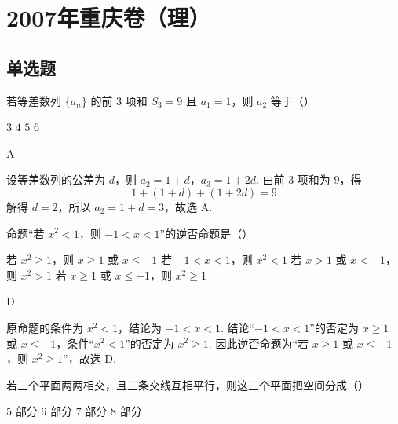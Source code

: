 
\chapter{2007年重庆卷（理）}

\section{单选题}

\begin{problem}
若等差数列 \(\{a_{n}\}\) 的前 \(3\) 项和 \(S_{3} = 9\) 且 \(a_1 = 1\)，则 \(a_2\) 等于（\quad）

\choices
    {\(3\)}
    {\(4\)}
    {\(5\)}
    {\(6\)}
\end{problem}

\begin{answer}
A
\end{answer}

\begin{solution}
设等差数列的公差为 \(d\)，则 \(a_2=1+d\)，\(a_3=1+2d\). 由前 \(3\) 项和为 \(9\)，得
\[
1+(1+d)+(1+2d)=9
\]
解得 \(d=2\)，所以 \(a_2=1+d=3\)，故选 A.
\end{solution}

\begin{problem}
命题“若 \(x^{2} < 1\)，则 \(-1 < x < 1\)”的逆否命题是（\quad）

\choices
    {若 \(x^{2} \geqslant 1\)，则 \(x \geqslant 1\) 或 \(x \leqslant -1\)}
    {若 \(-1 < x < 1\)，则 \(x^{2} < 1\)}
    {若 \(x > 1\) 或 \(x < -1\)，则 \(x^{2} > 1\)}
    {若 \(x \geqslant 1\) 或 \(x \leqslant -1\)，则 \(x^{2} \geqslant 1\)}
\end{problem}

\begin{answer}
D
\end{answer}

\begin{solution}
原命题的条件为 \(x^2<1\)，结论为 \(-1<x<1\). 结论“\(-1<x<1\)”的否定为 \(x\geqslant1\) 或 \(x\leqslant-1\)，条件“\(x^2<1\)”的否定为 \(x^2\geqslant1\). 因此逆否命题为“若 \(x\geqslant1\) 或 \(x\leqslant-1\)，则 \(x^2\geqslant1\)”，故选 D.
\end{solution}

\begin{problem}
若三个平面两两相交，且三条交线互相平行，则这三个平面把空间分成（\quad）

\choices
    {\(5\) 部分}
    {\(6\) 部分}
    {\(7\) 部分}
    {\(8\) 部分}
\end{problem}

